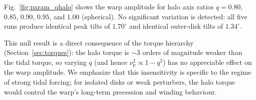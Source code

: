 Fig.~\ref{fig:param_qhalo} shows the warp amplitude for halo axis ratios $q = 0.80$, $0.85$, $0.90$, $0.95$, and $1.00$ (spherical). No significant variation is detected: all five runs produce identical peak tilts of $1.70^\circ$ and identical outer-disk tilts of $1.34^\circ$.

This null result is a direct consequence of the torque hierarchy (Section~\ref{sec:torques}): the halo torque is ${\sim}3$ orders of magnitude weaker than the tidal torque, so varying $q$ (and hence $\nu_p^2 \propto 1-q^2$) has no appreciable effect on the warp amplitude. We emphasize that this insensitivity is specific to the regime of strong tidal forcing; for isolated disks or weak perturbers, the halo torque would control the warp's long-term precession and winding behaviour.

